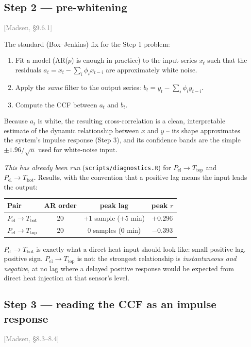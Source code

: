 \documentclass[11pt]{article}
\newcommand{\madsen}[1]{\textcolor{gray}{[Madsen, \S#1]}}
\begin{document}
\subsection*{Step 2 --- pre-whitening} \madsen{9.6.1}

The standard (Box--Jenkins) fix for the Step 1 problem:
\begin{enumerate}[label=(\roman*)]
\item Fit a model (AR($p$) is enough in practice) to the input series $x_t$
  such that the residuals $a_t = x_t - \sum_i \phi_i x_{t-i}$ are
  approximately white noise.
\item Apply the \emph{same} filter to the output series: $b_t = y_t -
  \sum_i \phi_i y_{t-i}$.
\item Compute the CCF between $a_t$ and $b_t$.
\end{enumerate}
Because $a_t$ is white, the resulting cross-correlation is a clean,
interpretable estimate of the dynamic relationship between $x$ and $y$ --
its shape approximates the system's impulse response (Step 3), and its
confidence bands are the simple $\pm 1.96/\sqrt{n}$ used for white-noise
input.

\emph{This has already been run} (\texttt{scripts/diagnostics.R}) for
$P_{\text{el}} \to T_{\text{top}}$ and $P_{\text{el}} \to T_{\text{bot}}$.
Results, with the convention that a positive lag means the input leads the
output:

\begin{center}
\begin{tabular}{lccc}
\toprule
Pair & AR order & peak lag & peak $r$ \\
\midrule
$P_{\text{el}} \to T_{\text{bot}}$ & 20 & $+1$ sample ($+5$ min) & $+0.296$ \\
$P_{\text{el}} \to T_{\text{top}}$ & 20 & $0$ samples ($0$ min) & $-0.393$ \\
\bottomrule
\end{tabular}
\end{center}

$P_{\text{el}} \to T_{\text{bot}}$ is exactly what a direct heat input
should look like: small positive lag, positive sign. $P_{\text{el}} \to
T_{\text{top}}$ is not: the strongest relationship is \emph{instantaneous
and negative}, at no lag where a delayed positive response would be
expected from direct heat injection at that sensor's level.

\subsection*{Step 3 --- reading the CCF as an impulse response} \madsen{8.3--8.4}
\end{document}

